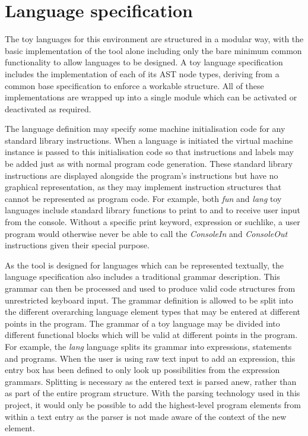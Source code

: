 \section{Language specification}

The toy languages for this environment are structured in a modular way, with the basic implementation of the tool alone including only the bare minimum common functionality to allow languages to be designed. A toy language specification includes the implementation of each of its AST node types, deriving from a common base specification to enforce a workable structure. All of these implementations are wrapped up into a single module which can be activated or deactivated as required.

The language definition may specify some machine initialisation code for any standard library instructions. When a language is initiated the virtual machine instance is passed to this initialisation code so that instructions and labels may be added just as with normal program code generation. These standard library instructions are displayed alongside the program's instructions but have no graphical representation, as they may implement instruction structures that cannot be represented as program code. For example, both \textit{fun} and \textit{lang} toy languages include standard library functions to print to and to receive user input from the console. Without a specific print keyword, expression or suchlike, a user program would otherwise never be able to call the \textit{ConsoleIn} and \textit{ConsoleOut} instructions given their special purpose.

As the tool is designed for languages which can be represented textually, the language specification also includes a traditional grammar description. This grammar can then be processed and used to produce valid code structures from unrestricted keyboard input. The grammar definition is allowed to be split into the different overarching language element types that may be entered at different points in the program. The grammar of a toy language may be divided into different functional blocks which will be valid at different points in the program. For example, the \textit{lang} language splits its grammar into expressions, statements and programs. When the user is using raw text input to add an expression, this entry box has been defined to only look up possibilities from the expression grammars. Splitting is necessary as the entered text is parsed anew, rather than as part of the entire program structure. With the parsing technology used in this project, it would only be possible to add the highest-level program elements from within a text entry as the parser is not made aware of the context of the new element.


